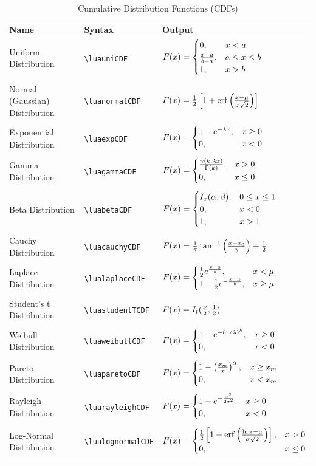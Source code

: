 \begin{table}[ht]
	\centering
	\renewcommand{\arraystretch}{1.5}
	\small %
	\begin{tabularx}{\textwidth}{lXl}
		\toprule
		\textbf{Name} & \textbf{Syntax} & \textbf{Output} \\
		\midrule
		Uniform Distribution & \verb|\luauniCDF| & $\luauniCDF$ \\\\
		Normal (Gaussian) Distribution & \verb|\luanormalCDF| & $\luanormalCDF$ \\\\
		Exponential Distribution & \verb|\luaexpCDF| & $\luaexpCDF$ \\\\
		Gamma Distribution & \verb|\luagammaCDF| & $\luagammaCDF$ \\\\
		Beta Distribution & \verb|\luabetaCDF| & $\luabetaCDF$ \\\\
		Cauchy Distribution & \verb|\luacauchyCDF| & $\luacauchyCDF$ \\\\
		Laplace Distribution & \verb|\lualaplaceCDF| & $\lualaplaceCDF$ \\\\
		Student's t Distribution & \verb|\luastudentTCDF| & $\luastudentTCDF$ \\\\
		Weibull Distribution & \verb|\luaweibullCDF| & $\luaweibullCDF$ \\\\
		Pareto Distribution & \verb|\luaparetoCDF| & $\luaparetoCDF$ \\\\
		Rayleigh Distribution & \verb|\luarayleighCDF| & $\luarayleighCDF$ \\\\
		Log-Normal Distribution & \verb|\lualognormalCDF| & $\lualognormalCDF$ \\\\
		\bottomrule
	\end{tabularx}
	\caption{Cumulative Distribution Functions (CDFs)}
\end{table}



